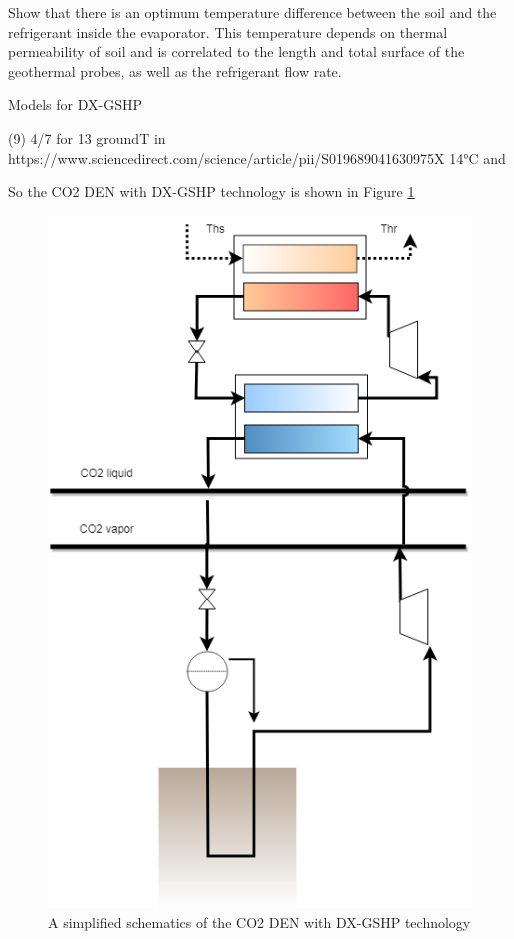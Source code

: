 \documentclass{article}
\begin{document}
Show that there is an optimum temperature difference between the soil and the refrigerant inside the evaporator. This temperature depends on thermal permeability of soil and is correlated to the length and total surface of the geothermal probes, as well as the refrigerant flow rate.

Models for DX-GSHP
\cite{eslami-nejadModelingTwophaseCO2filled2014a}
\cite{ghazizade-ahsaeeEnergyExergyInvestigation2018}
\cite{austinParametricStudyPerformance2011}
\cite{eslami-nejadQuasitransientModelTranscritical2015}
 
(9) 4/7 for 13 groundT in https://www.sciencedirect.com/science/article/pii/S019689041630975X 
14\si{\celsius}\cite{ghazizade-ahsaeeEnergyExergyInvestigation2018} and \cite{austinParametricStudyPerformance2011}

So the CO2 DEN with DX-GSHP technology is shown in Figure \ref{fig:co2_gshp}

\begin{figure}[h!]
\centering
\includegraphics[width=1\textwidth]{CO2-DX-GSHP.png}
\caption{A simplified schematics of the CO2 DEN with DX-GSHP technology}
\label{fig:co2_gshp}
\end{figure}
\end{document}
